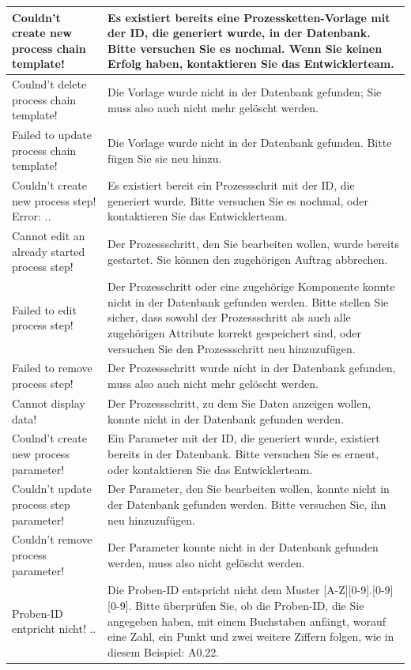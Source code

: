 \documentclass[enabledeprecatedfontcommands,fontsize=12pt,paper=a4,twoside]{scrartcl}
\begin{document}
\begin{longtable}[c]{|p{5cm}|p{10cm}|}
Couldn't create new process chain template! & Es existiert bereits eine Prozessketten-Vorlage mit der ID, die generiert wurde, in der Datenbank. Bitte versuchen Sie es nochmal. Wenn Sie keinen Erfolg haben, kontaktieren Sie das Entwicklerteam. \\ \hline
Coulnd't delete process chain template! & Die Vorlage wurde nicht in der Datenbank gefunden; Sie muss also auch nicht mehr gelöscht werden. \\ \hline
Failed to update process chain template! & Die Vorlage wurde nicht in der Datenbank gefunden. Bitte fügen Sie sie neu hinzu. \\ \hline
Couldn't create new process step! Error: .. &  Es existiert bereit ein Prozessschrit mit der ID, die generiert wurde. Bitte versuchen Sie es nochmal, oder kontaktieren Sie das Entwicklerteam. \\ \hline
Cannot edit an already started process step! & Der Prozessschritt, den Sie bearbeiten wollen, wurde bereits gestartet. Sie können den zugehörigen Auftrag abbrechen.  \\ \hline
Failed to edit process step! & Der Prozesschritt oder eine zugehörige Komponente konnte nicht in der Datenbank gefunden werden. Bitte stellen Sie sicher, dass sowohl der Prozessschritt als auch alle zugehörigen Attribute korrekt gespeichert sind, oder versuchen Sie den Prozessschritt neu hinzuzufügen. \\ \hline
Failed to remove process step! & Der Prozessschritt wurde nicht in der Datenbank gefunden, muss also auch nicht mehr gelöscht werden. \\ \hline
Cannot display data! & Der Prozessschritt, zu dem Sie Daten anzeigen wollen, konnte nicht in der Datenbank gefunden werden. \\ \hline
Coulnd't create new process parameter! & Ein Parameter mit der ID, die generiert wurde, existiert bereits in der Datenbank. Bitte versuchen Sie es erneut, oder kontaktieren Sie das Entwicklerteam. \\ \hline
Couldn't update process step parameter! & Der Parameter, den Sie bearbeiten wollen, konnte nicht in der Datenbank gefunden werden. Bitte versuchen Sie, ihn neu hinzuzufügen. \\ \hline
Couldn't remove process parameter! & Der Parameter konnte nicht in der Datenbank gefunden werden, muss also nicht gelöscht werden. \\ \hline
Proben-ID entpricht nicht! ..  & Die Proben-ID entspricht nicht dem Muster [A-Z][0-9].[0-9][0-9]. Bitte überprüfen Sie, ob die Proben-ID, die Sie angegeben haben, mit einem Buchstaben anfängt, worauf eine Zahl, ein Punkt und zwei weitere Ziffern folgen, wie in diesem Beispiel: A0.22. \\ \hline

\end{longtable}
\end{document}

